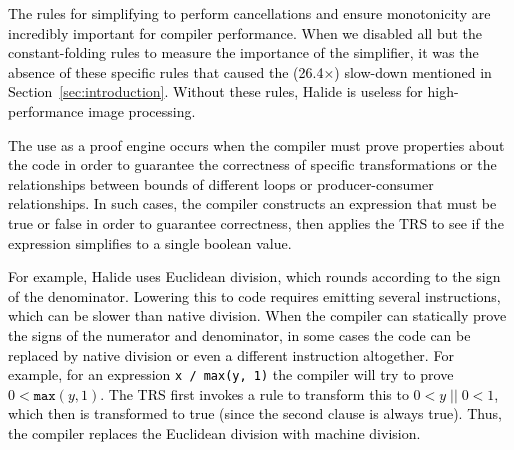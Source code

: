 \documentclass[acmsmall,review]{acmart}\settopmatter{printfolios=true,printccs=false,printacmref=false}
\newcommand{\modified}[1]{\textcolor{black}{{#1}}}
\newcommand{\hmax}[0]{\texttt{max}}
\newcommand{\hmin}[0]{\texttt{min}}
\begin{document}
\modified{The rules for simplifying to perform cancellations and
  ensure monotonicity are incredibly important for compiler
  performance. When we disabled all but the constant-folding rules to
  measure the importance of the simplifier, it was the absence of
  these specific rules that caused the (26.4$\times$) slow-down
  mentioned in Section~\ref{sec:introduction}. Without these rules,
  Halide is useless for high-performance image
  processing.}


\modified{The use as a proof engine occurs when the compiler must prove properties about the code in order to guarantee the
  correctness of specific transformations or the relationships between bounds of
  different loops or producer-consumer relationships.  In such cases, the compiler constructs
  an expression that must be true or false in order to guarantee correctness, then applies
  the TRS to see if the expression simplifies to a single boolean value.}

\modified{For example, Halide uses Euclidean division, which rounds according to the sign of the
  denominator.  Lowering this to code requires emitting several instructions, which can be
  slower than native division.  When the compiler can statically prove the signs of the numerator
  and denominator, in some cases the code can be replaced by native division or even a different
  instruction altogether.  For example, for an expression \texttt{x / max(y, 1)} the compiler
  will try to prove $0 < \hmax(y, 1)$.  The TRS first invokes a rule to transform this to
  $0 < y\; ||\; 0 < 1$, which then is transformed to true (since the second clause is always true).
  Thus, the compiler replaces the Euclidean division with machine division.}
\end{document}
